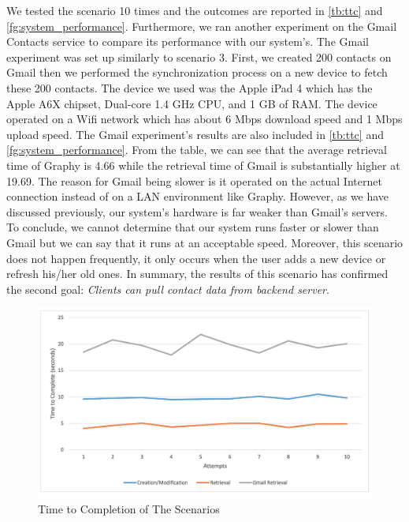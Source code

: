 We tested the scenario 10 times and the outcomes are reported in \autoref{tb:ttc} and \autoref{fg:system_performance}. Furthermore, we ran another experiment on the Gmail Contacts service to compare its performance with our system's. The Gmail experiment was set up similarly to scenario 3. First, we created 200 contacts on Gmail then we performed the synchronization process on a new device to fetch these 200 contacts. The device we used was the Apple iPad 4 which has the Apple A6X chipset, Dual-core 1.4 GHz CPU, and 1 GB of RAM. The device operated on a Wifi network which has about 6 Mbps download speed and 1 Mbps upload speed. The Gmail experiment's results are also included in \autoref{tb:ttc} and \autoref{fg:system_performance}. From the table, we can see that the average retrieval time of Graphy is 4.66 while the retrieval time of Gmail is substantially higher at 19.69. The reason for Gmail being slower is it operated on the actual Internet connection instead of on a LAN environment like Graphy. However, as we have discussed previously, our system's hardware is far weaker than Gmail's servers. To conclude, we cannot determine that our system runs faster or slower than Gmail but we can say that it runs at an acceptable speed. Moreover, this scenario does not happen frequently, it only occurs when the user adds a new device or refresh his/her old ones. In summary, the results of this scenario has confirmed the second goal: \textit{Clients can pull contact data from backend server}.

\begin{figure}[!h]
\begin{centering}
\includegraphics[scale=0.45]{pics/system_performance.png}
\caption{Time to Completion of The Scenarios}\label{fg:system_performance}
\end{centering}
\end{figure}


